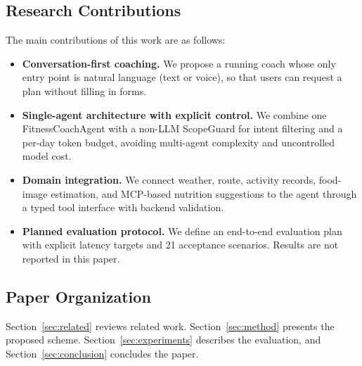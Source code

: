 \subsection{Research Contributions}
The main contributions of this work are as follows:
\begin{itemize}
\item \textbf{Conversation-first coaching.} We propose a running coach whose only entry point is natural language (text or voice), so that users can request a plan without filling in forms.
\item \textbf{Single-agent architecture with explicit control.} We combine one FitnessCoachAgent with a non-LLM ScopeGuard for intent filtering and a per-day token budget, avoiding multi-agent complexity and uncontrolled model cost.
\item \textbf{Domain integration.} We connect weather, route, activity records, food-image estimation, and MCP-based nutrition suggestions to the agent through a typed tool interface with backend validation.
\item \textbf{Planned evaluation protocol.} We define an end-to-end evaluation plan with explicit latency targets and 21 acceptance scenarios. Results are not reported in this paper.
\end{itemize}

\subsection{Paper Organization}
Section~\ref{sec:related} reviews related work. Section~\ref{sec:method} presents the proposed scheme. Section~\ref{sec:experiments} describes the evaluation, and Section~\ref{sec:conclusion} concludes the paper.
